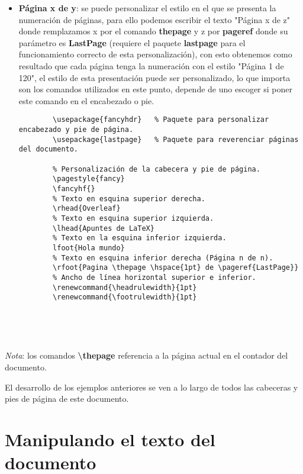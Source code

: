 \begin{itemize}
\begin{lstlisting}
        
    
        
    \end{lstlisting}
    \item \textbf{Página x de y}: se puede personalizar el estilo en el que se presenta la numeración de páginas, para ello podemos escribir el texto "Página x de z" donde remplazamos x por el comando \textbf{thepage} y z por \textbf{pageref} donde su parámetro es \textbf{LastPage} (requiere el paquete \textbf{lastpage} para el funcionamiento correcto de esta personalización), con esto obtenemos como resultado que cada página tenga la numeración con el estilo "Página 1 de 120", el estilo de esta presentación puede ser personalizado, lo que importa son los comandos utilizados en este punto, depende de uno escoger si poner este comando en el encabezado o pie.
    \begin{lstlisting}
        \usepackage{fancyhdr}	% Paquete para personalizar encabezado y pie de página.
        \usepackage{lastpage}	% Paquete para reverenciar páginas del documento.
    
        % Personalización de la cabecera y pie de página.
        \pagestyle{fancy}
        \fancyhf{}
        % Texto en esquina superior derecha.
        \rhead{Overleaf}
        % Texto en esquina superior izquierda.
        \lhead{Apuntes de LaTeX}
        % Texto en la esquina inferior izquierda.
        lfoot{Hola mundo}
        % Texto en esquina inferior derecha (Página n de n).
        \rfoot{Pagina \thepage \hspace{1pt} de \pageref{LastPage}}
        % Ancho de línea horizontal superior e inferior.
        \renewcommand{\headrulewidth}{1pt}
        \renewcommand{\footrulewidth}{1pt}

        
    
        
    \end{lstlisting}
\end{itemize}

\textit{Nota}: los comandos \textbf{\textbackslash{thepage}} referencia a la página actual en el contador del documento.

El desarrollo de los ejemplos anteriores se ven a lo largo de todos las cabeceras y pies de página de este documento.



\section{Manipulando el texto del documento}

